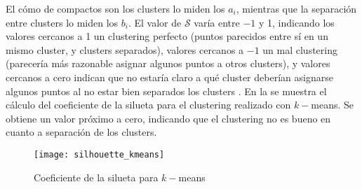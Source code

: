 					 El cómo de compactos son los clusters lo miden los $a_i$, mientras que la separación entre clusters lo miden los $b_i$. El valor de $\mathcal{S}$ varía entre $-1$ y 1, indicando los valores cercanos a 1 un clustering perfecto (puntos parecidos entre sí en un mismo cluster, y clusters separados), valores cercanos a $-1$ un mal clustering (parecería más razonable asignar algunos puntos a otros clusters), y valores cercanos a cero indican que no estaría claro a qué cluster deberían asignarse algunos puntos al no estar bien separados los clusters \cite{interpretacion_silhouette}. En la  se muestra el cálculo del coeficiente de la silueta para el clustering realizado con $k-$means. Se obtiene un valor próximo a cero, indicando que el clustering no es bueno en cuanto a separación de los clusters. \\
					 
					 \begin{figure}[!h]
					 	\centering
					 	\texttt{[image: silhouette\_kmeans]}
					 	\caption{Coeficiente de la silueta para $k-$means}
					 	\label{fig:silhouette_kmeans}
					 \end{figure} 
				